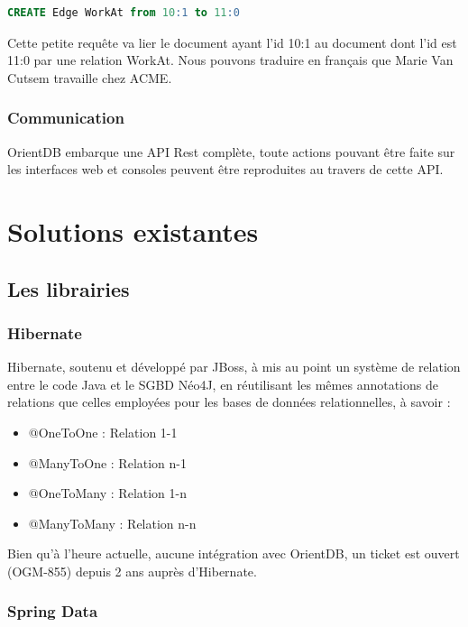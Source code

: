 \documentclass[a4paper,fleqn,12pt]{report}
\begin{document}
\begin{lstlisting}[language=SQL]
CREATE Edge WorkAt from 10:1 to 11:0
\end{lstlisting}

Cette petite requête va lier le document ayant l'id 10:1 au document dont l'id est 11:0 par une relation WorkAt. Nous pouvons traduire en français que Marie Van Cutsem travaille chez ACME.


\subsection{Communication}

OrientDB embarque une API Rest complète, toute actions pouvant être faite sur les interfaces web et consoles peuvent être reproduites au travers de cette API. 


\chapter{Solutions existantes}


\section{Les librairies} 

\subsection{Hibernate}

Hibernate, soutenu et développé par JBoss, à mis au point un système de relation entre le code Java et le SGBD Néo4J, en réutilisant les mêmes annotations de relations que celles employées pour les bases de données relationnelles, à savoir :

\begin{itemize}
\item @OneToOne : Relation 1-1
\item @ManyToOne : Relation n-1
\item @OneToMany : Relation 1-n
\item @ManyToMany : Relation n-n
\end{itemize}

Bien qu'à l'heure actuelle, aucune intégration avec OrientDB, un ticket est ouvert (OGM-855) depuis 2 ans auprès d'Hibernate.

\subsection{Spring Data}
\end{document}
